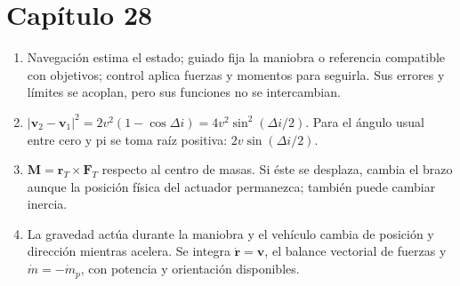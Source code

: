 \section*{Capítulo 28}
\begin{enumerate}
\item Navegación estima el estado; guiado fija la maniobra o referencia compatible con objetivos; control aplica fuerzas y momentos para seguirla. Sus errores y límites se acoplan, pero sus funciones no se intercambian.
\item $|\mathbf v_2-\mathbf v_1|^2=2v^2(1-\cos\Delta i)=4v^2\sin^2(\Delta i/2)$. Para el ángulo usual entre cero y pi se toma raíz positiva: $2v\sin(\Delta i/2)$.
\item $\mathbf M=\mathbf r_T\times\mathbf F_T$ respecto al centro de masas. Si éste se desplaza, cambia el brazo aunque la posición física del actuador permanezca; también puede cambiar inercia.
\item La gravedad actúa durante la maniobra y el vehículo cambia de posición y dirección mientras acelera. Se integra $\dot{\mathbf r}=\mathbf v$, el balance vectorial de fuerzas y $\dot m=-\dot m_p$, con potencia y orientación disponibles.
\end{enumerate}
